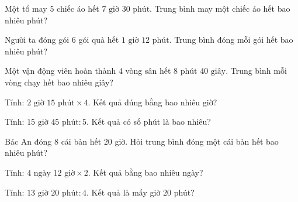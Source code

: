 \begin{ex}
  Một tổ may $5$ chiếc áo hết $7\text{ giờ } 30\text{ phút}$. Trung bình may một chiếc áo hết bao nhiêu phút?
\end{ex}

\begin{ex}
  Người ta đóng gói $6$ gói quà hết $1\text{ giờ } 12\text{ phút}$. Trung bình đóng mỗi gói hết bao nhiêu phút?
\end{ex}

\begin{ex}
  Một vận động viên hoàn thành $4$ vòng sân hết $8\text{ phút } 40\text{ giây}$. Trung bình mỗi vòng chạy hết bao nhiêu giây?
\end{ex}

\begin{ex}
  Tính: $2\text{ giờ } 15\text{ phút} \times 4$. Kết quả đúng bằng bao nhiêu giờ?
\end{ex}

\begin{ex}
  Tính: $15\text{ giờ } 45\text{ phút} : 5$. Kết quả có số phút là bao nhiêu?
\end{ex}

\begin{ex}
  Bác An đóng $8$ cái bàn hết $20$ giờ. Hỏi trung bình đóng một cái bàn hết bao nhiêu phút?
\end{ex}

\begin{ex}
  Tính: $4\text{ ngày } 12\text{ giờ} \times 2$. Kết quả bằng bao nhiêu ngày?
\end{ex}

\begin{ex}
  Tính: $13\text{ giờ } 20\text{ phút} : 4$. Kết quả là mấy giờ $20$ phút?
\end{ex}

